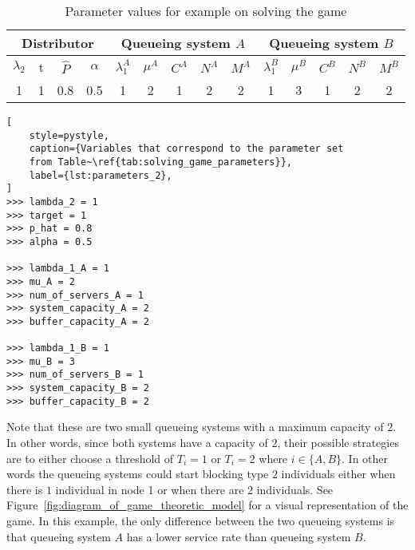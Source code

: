 \begin{table}[H]
    \caption{Parameter values for example on solving the game}
    \begin{center}
        \begin{tabular}{||c|c|c|c||c|c|c|c|c||c|c|c|c|c||}
            \hline
            \multicolumn{4}{||c||}{\textbf{Distributor}} &
            \multicolumn{5}{c||}{\textbf{Queueing system \(A\)}} &
            \multicolumn{5}{c||}{\textbf{Queueing system \(B\)}} \\
            \hline
            \(\lambda_2\) & t & \footnotesize{\(\hat{P}\)} & \(\alpha\) &
            \(\lambda_1^A\) & \(\mu^A\) & \(C^A\) & \(N^A\) & \(M^A\) &
            \(\lambda_1^B\) & \(\mu^B\) & \(C^B\) & \(N^B\) & \(M^B\) \\
            \hline
            1 & 1 & 0.8 & 0.5 &
            1 & 2 & 1 & 2 & 2 &
            1 & 3 & 1 & 2 & 2 \\
            \hline
        \end{tabular}
    \end{center}
    \label{tab:solving_game_parameters}
\end{table}

\begin{lstlisting}[
    style=pystyle,
    caption={Variables that correspond to the parameter set
    from Table~\ref{tab:solving_game_parameters}},
    label={lst:parameters_2},
]
>>> lambda_2 = 1
>>> target = 1
>>> p_hat = 0.8
>>> alpha = 0.5

>>> lambda_1_A = 1
>>> mu_A = 2
>>> num_of_servers_A = 1
>>> system_capacity_A = 2
>>> buffer_capacity_A = 2
    
>>> lambda_1_B = 1
>>> mu_B = 3
>>> num_of_servers_B = 1
>>> system_capacity_B = 2
>>> buffer_capacity_B = 2

\end{lstlisting}

Note that these are two small queueing systems with a maximum capacity of \(2\).
In other words, since both systems have a capacity of \(2\), their possible
strategies are to either choose a threshold of \(T_i = 1\) or \(T_i = 2\) where
\(i \in \{A, B\}\).
In other words the queueing systems could start blocking type \(2\) individuals
either when there is \(1\) individual in node 1 or when there are \(2\)
individuals.
See Figure~\ref{fig:diagram_of_game_theoretic_model} for a visual representation
of the game.
In this example, the only difference between the two queueing systems
is that queueing system \(A\) has a lower service rate than queueing system
\(B\).

